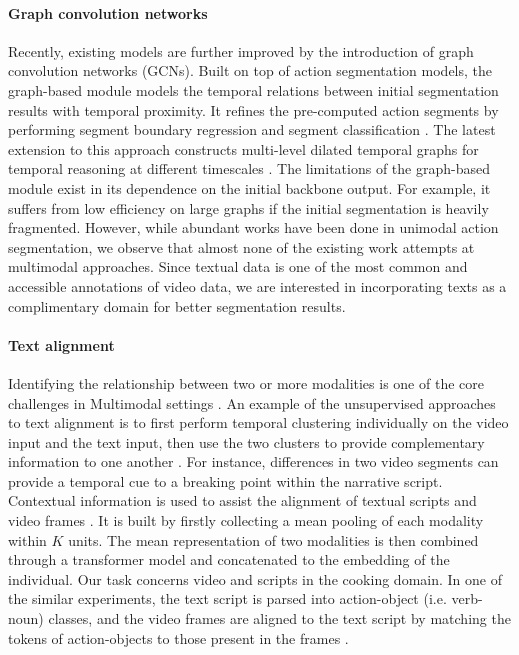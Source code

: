 \paragraph{Graph convolution networks} Recently, existing models are further improved by the introduction of graph convolution networks (GCNs). Built on top of action segmentation models, the graph-based module models the temporal relations between initial segmentation results with temporal proximity. It refines the pre-computed action segments by performing segment boundary regression and segment classification \cite{graphbased2020}. The latest extension to this approach constructs multi-level dilated temporal graphs for temporal reasoning at different timescales \cite{wang2020temporal}. The limitations of the graph-based module exist in its dependence on the initial backbone output. For example, it suffers from low efficiency on large graphs if the initial segmentation is heavily fragmented. However, while abundant works have been done in unimodal action segmentation, we observe that almost none of the existing work attempts at multimodal approaches. Since textual data is one of the most common and accessible annotations of video data, we are interested in incorporating texts as a complimentary domain for better segmentation results.

\paragraph{Text alignment}
\iffalse
Covered paper:
- Multimodal Machine Learning: A Survey and Taxonomy
- Learning Semantic Concepts and Temporal Alignment for Narrated Video Procedural Captioning
- Unsupervised Learning from Narrated Instruction Videos
- What’s Cookin’? Interpreting Cooking Videos using Text, Speech and Vision
\fi
Identifying the relationship between two or more modalities is one of the core challenges in Multimodal settings \cite{MultiModalSurvey}. An example of the unsupervised approaches to text alignment is to first perform temporal clustering individually on the video input and the text input, then use the two clusters to provide complementary information to one another \cite{unsupervised-align}. For instance, differences in two video segments can provide a temporal cue to a breaking point within the narrative script. Contextual information is used to assist the alignment of textual scripts and video frames \cite{temporalAlignShi}. It is built by firstly collecting a mean pooling of each modality within $K$ units. The mean representation of two modalities is then combined through a transformer model and concatenated to the embedding of the individual. Our task concerns video and scripts in the cooking domain. In one of the similar experiments, the text script is parsed into action-object (i.e. verb-noun) classes, and the video frames are aligned to the text script by matching the tokens of action-objects to those present in the frames \cite{malmaud-etal-2015-whats}.

